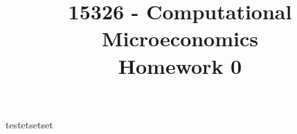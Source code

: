 \documentclass{article}
\title{15326 - Computational Microeconomics\\
Homework 0}
\begin{document}
testetsetset
\end{document}
